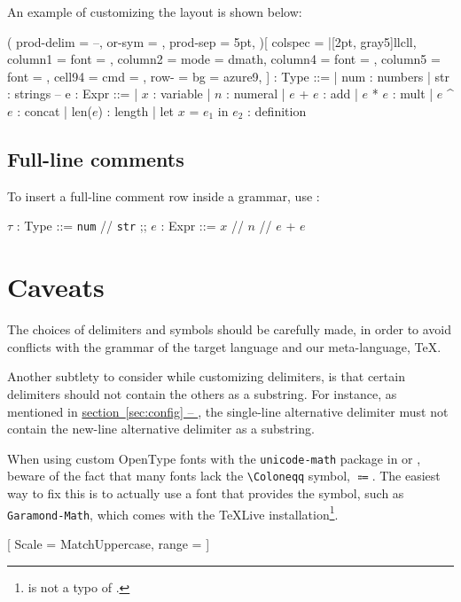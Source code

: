 \documentclass[11pt]{article}
\newcommand*{\secref}[1]{\hyperref[{#1}]{section~\ref*{#1} -- \emph{\nameref*{#1}}}}
\newcommand*{\XeLaTeX}{\hologo{XeLaTeX}}
\newcommand*{\LuaLaTeX}{\hologo{LuaLaTeX}}
\begin{document}
An example of customizing the layout is shown below:
\begin{example}[righthand width=.51\linewidth]
\begin{center}
\begin{bnf}(
  prod-delim = {--},
  or-sym = {},
  prod-sep = 5pt,
)[
  colspec = {|[2pt, gray5]llcll},
  column{1} = {font = \sffamily},
  column{2} = {mode = dmath},
  column{4} = {font = \ttfamily},
  column{5} = {font = \itshape},
  cell{9}{4} = {cmd = \fbox},
  row{-} = {bg = azure9},
]
  \tau : Type ::=
  | num : numbers
  | str : strings
  --
  e : Expr ::=
  | $x$ : variable
  | $n$ : numeral
  | $e$ + $e$ : add
  | $e$ * $e$ : mult
  | $e$ \textasciicircum{} $e$ : concat
  | len($e$) : length
  | let $x$ = $e_1$ in $e_2$ : definition
\end{bnf}
\end{center}
\end{example}

\subsection{Full-line comments}\label{subsec:comment}
To insert a full-line comment row inside a grammar, use :
\begin{example}
\begin{center}
\begin{bnf}
  $\tau$ : Type ::= \texttt{num} // \texttt{str}
  ;;
  $e$ : Expr ::= $x$ // $n$ // $e$ + $e$
\end{bnf}
\end{center}
\end{example}


\section{Caveats}
The choices of delimiters and symbols should be carefully made, in order to avoid conflicts with the grammar of the target language and our meta-language, \TeX{}.

Another subtlety to consider while customizing delimiters, is that certain delimiters should not contain the others as a substring.
For instance, as mentioned in \secref{sec:config}, the single-line alternative delimiter must not contain the new-line alternative delimiter as a substring.

When using custom OpenType fonts with the \verb/unicode-math/ package in \XeLaTeX{} or \LuaLaTeX{}, beware of the fact that many fonts lack the \verb/\Coloneqq/ symbol, $\Coloneqq$.
The easiest way to fix this is to actually use a font that provides the symbol, such as \verb/Garamond-Math/, which comes with the \TeX{}Live installation\footnote{\fakeverb{\Coloneq} is not a typo of \fakeverb{\Coloneqq}.}.
\begin{listing}
[
  Scale = MatchUppercase,
  range = {\Coloneq}
]
\end{listing}
\end{document}
